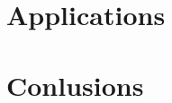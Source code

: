 \part{Applications}
\label{part:applications}



\part{Conlusions}
\label{part:conclusion}

% 
\begin{appendix}
  
  
\end{appendix}
\DeclareRobustCommand{\van}[3]{#2 #1}

\renewcommand{\bibname}{References}


\renewcommand{\BrainFuckChapter}{}
\ifx\finalversion\undefined
\listoftodos
\fi
%


